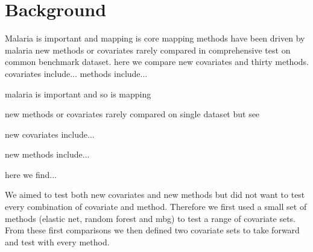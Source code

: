 \documentclass{bmcart}
\begin{document}


\section*{Background}

Malaria is important and mapping is core
mapping methods have been driven by malaria
new methods or covariates rarely compared in comprehensive test on common benchmark dataset.
here we compare new covariates and thirty methods.
covariates include...
methods include...



malaria is important and so is mapping

new methods or covariates rarely compared on single dataset
but see

new covariates include...

new methods include...

here we find...




We aimed to test both new covariates and new methods but did not want to test every combination of covariate and method.
Therefore we first used a small set of methods (elastic net, random forest and mbg) to test a range of covariate sets.
From these first comparisons we then defined two covariate sets to take forward and test with every method.

\end{document}
